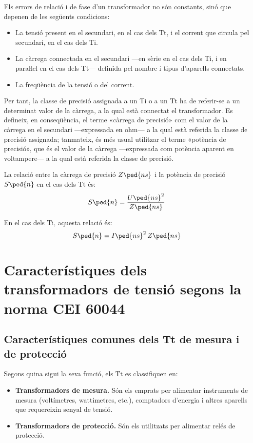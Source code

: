 Els errors de relació i de fase d'un transformador no són
constants, sinó que depenen de les següents condicions:
\begin{itemize}
   \item La tensió present en el secundari, en el cas dels Tt, i el corrent que
   circula    pel secundari, en el cas dels Ti.
   \item La càrrega connectada en el secundari ---en sèrie en el cas dels Ti,
   i en paraŀlel en el cas dels Tt--- definida pel nombre i tipus d'aparells connectats.
   \item La freqüència de la tensió o del corrent.
\end{itemize}

Per tant, la classe de precisió assignada a un Ti o a un Tt ha de
referir-se a un determinat valor de la càrrega, a la qual està
connectat el transformador. Es defineix, en conseqüència, el terme
«càrrega de precisió» com el valor de la càrrega en el secundari
---expressada en ohm--- a la qual està referida la classe de precisió
assignada; tanmateix, és més usual  utilitzar el terme «potència
de precisió», que és el valor de la càrrega ---expressada com potència aparent en voltampere---
 a la qual està referida la classe de precisió.

La relació entre la càrrega de precisió $Z\ped{ns}$ i la potència de
precisió $S\ped{n}$ en el cas dels Tt és:
\begin{equation}
    S\ped{n} = \frac{U\ped{ns}^2}{Z\ped{ns}}
\end{equation}

En el cas dels Ti, aquesta relació és:
\begin{equation}\label{eq:sn_ti}
    S\ped{n} = I\ped{ns}^2 \,Z\ped{ns}
\end{equation}


\section{Característiques dels transformadors de tensió segons la norma CEI 60044}

\subsection{Característiques comunes dels Tt de mesura i de protecció}

Segons quina sigui la seva funció, els Tt es classifiquen en:
\begin{itemize}
	\item \textbf{Transformadors de mesura.} Són els emprats per alimentar
	instruments de mesura (voltímetres, wattímetres, etc.),         comptadors d'energia i altres aparells que requereixin senyal de tensió.
	\item \textbf{Transformadors de protecció.}  Són els utilitzats per
	alimentar relés de protecció.
\end{itemize}

